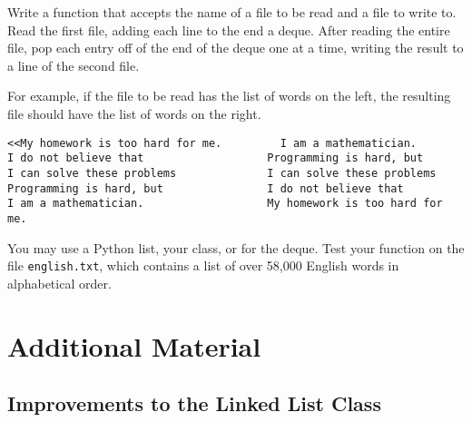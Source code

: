 \begin{problem} %
Write a function that accepts the name of a file to be read and a file to write to.
Read the first file, adding each line to the end a deque.
After reading the entire file, pop each entry off of the end of the deque one at a time, writing the result to a line of the second file.

For example, if the file to be read has the list of words on the left, the resulting file should have the list of words on the right.

\begin{lstlisting}
<<My homework is too hard for me.         I am a mathematician.
I do not believe that                   Programming is hard, but
I can solve these problems              I can solve these problems
Programming is hard, but                I do not believe that
I am a mathematician.                   My homework is too hard for me.
\end{lstlisting}

You may use a Python list, your  class, or  for the deque.
Test your function on the file \texttt{english.txt}, which contains a list of over 58,000 English words in alphabetical order.
\end{problem}

\newpage

\section*{Additional Material} %

\subsection*{Improvements to the Linked List Class} %

